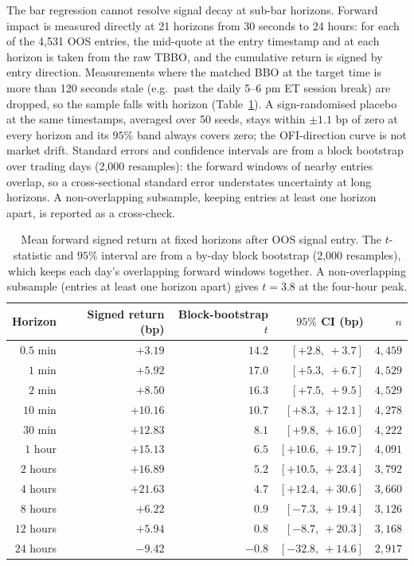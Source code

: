 ﻿\documentclass[11pt,a4paper]{article}
\begin{document}
The bar regression cannot resolve signal decay at sub-bar horizons. Forward impact is measured directly at 21 horizons from 30 seconds to 24 hours: for each of the 4{,}531 OOS entries, the mid-quote at the entry timestamp and at each horizon is taken from the raw TBBO, and the cumulative return is signed by entry direction. Measurements where the matched BBO at the target time is more than 120 seconds stale (e.g.\ past the daily 5--6 pm ET session break) are dropped, so the sample falls with horizon (Table~\ref{tab:decay}). A sign-randomised placebo at the same timestamps, averaged over 50 seeds, stays within $\pm 1.1$ bp of zero at every horizon and its $95\%$ band always covers zero; the OFI-direction curve is not market drift. Standard errors and confidence intervals are from a block bootstrap over trading days (2{,}000 resamples): the forward windows of nearby entries overlap, so a cross-sectional standard error understates uncertainty at long horizons. A non-overlapping subsample, keeping entries at least one horizon apart, is reported as a cross-check.

\begin{table}[H]
\centering
\small
\begin{tabular}{rrrrr}
\toprule
Horizon & Signed return (bp) & Block-bootstrap $t$ & $95\%$ CI (bp) & $n$ \\
\midrule
$0.5$ min  & $+3.19$  & $14.2$ & $[+2.8,\ +3.7]$   & $4{,}459$ \\
$1$ min    & $+5.92$  & $17.0$ & $[+5.3,\ +6.7]$   & $4{,}529$ \\
$2$ min    & $+8.50$  & $16.3$ & $[+7.5,\ +9.5]$   & $4{,}529$ \\
$10$ min   & $+10.16$ & $10.7$ & $[+8.3,\ +12.1]$  & $4{,}278$ \\
$30$ min   & $+12.83$ & $8.1$  & $[+9.8,\ +16.0]$  & $4{,}222$ \\
$1$ hour   & $+15.13$ & $6.5$  & $[+10.6,\ +19.7]$ & $4{,}091$ \\
$2$ hours  & $+16.89$ & $5.2$  & $[+10.5,\ +23.4]$ & $3{,}792$ \\
$4$ hours  & $+21.63$ & $4.7$  & $[+12.4,\ +30.6]$ & $3{,}660$ \\
$8$ hours  & $+6.22$  & $0.9$  & $[-7.3,\ +19.4]$  & $3{,}126$ \\
$12$ hours & $+5.94$  & $0.8$  & $[-8.7,\ +20.3]$  & $3{,}168$ \\
$24$ hours & $-9.42$  & $-0.8$ & $[-32.8,\ +14.6]$ & $2{,}917$ \\
\bottomrule
\end{tabular}
\caption{Mean forward signed return at fixed horizons after OOS signal entry. The $t$-statistic and $95\%$ interval are from a by-day block bootstrap (2{,}000 resamples), which keeps each day's overlapping forward windows together. A non-overlapping subsample (entries at least one horizon apart) gives $t = 3.8$ at the four-hour peak.}
\label{tab:decay}
\end{table}
\end{document}

